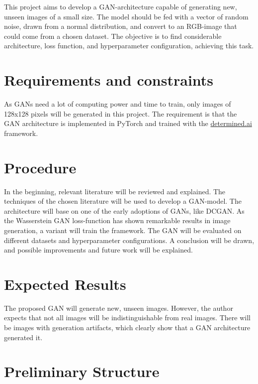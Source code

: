 \documentclass[]{article}
\begin{document}
\noindent
This project aims to develop a GAN-architecture capable of generating new, unseen images of a small size. The model should be fed with a vector of random noise, drawn from a normal distribution, and convert to an RGB-image that could come from a chosen dataset. The objective is to find considerable architecture, loss function, and hyperparameter configuration, achieving this task.

\section{Requirements and constraints}

\noindent
As GANs need a lot of computing power and time to train, only images of 128x128 pixels will be generated in this project. The requirement is that the GAN architecture is implemented in PyTorch \cite{paszke2019pytorch} and trained with the \url{determined.ai} framework.

\section{Procedure}

\noindent
In the beginning, relevant literature will be reviewed and explained. The techniques of the chosen literature will be used to develop a GAN-model. The architecture will base on one of the early adoptions of GANs, like DCGAN. As the Wasserstein GAN \cite{arjovsky2017wgan} loss-function has shown remarkable results in image generation, a variant will train the framework. The GAN will be evaluated on different datasets and hyperparameter configurations. A conclusion will be drawn, and possible improvements and future work will be explained.

\section{Expected Results}

\noindent
The proposed GAN will generate new, unseen images. However, the author expects that not all images will be indistinguishable from real images. There will be images with generation artifacts, which clearly show that a GAN architecture generated it.



\newpage

\section{Preliminary Structure}
\end{document}
